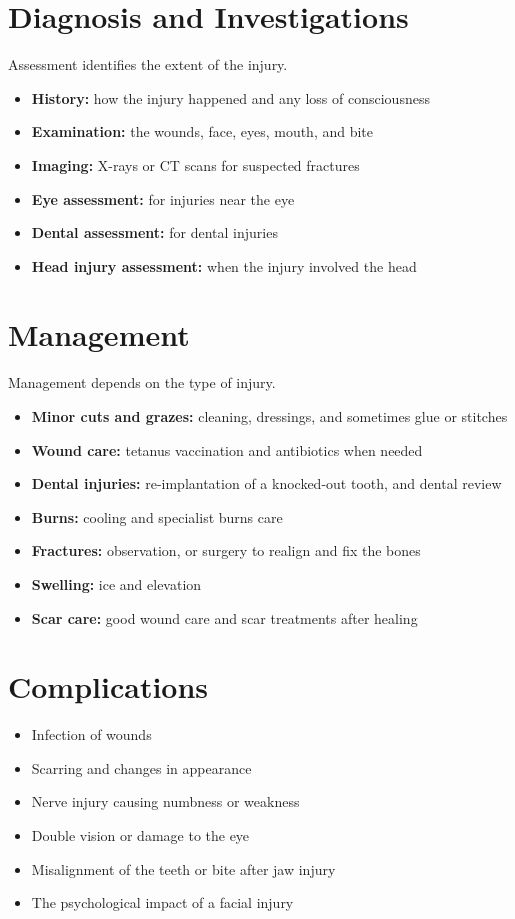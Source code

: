 \section*{Diagnosis and Investigations}
Assessment identifies the extent of the injury.
\begin{itemize}
    \item \textbf{History:} how the injury happened and any loss of consciousness
    \item \textbf{Examination:} the wounds, face, eyes, mouth, and bite
    \item \textbf{Imaging:} X-rays or CT scans for suspected fractures
    \item \textbf{Eye assessment:} for injuries near the eye
    \item \textbf{Dental assessment:} for dental injuries
    \item \textbf{Head injury assessment:} when the injury involved the head
\end{itemize}

\section*{Management}
Management depends on the type of injury.
\begin{itemize}
    \item \textbf{Minor cuts and grazes:} cleaning, dressings, and sometimes glue or stitches
    \item \textbf{Wound care:} tetanus vaccination and antibiotics when needed
    \item \textbf{Dental injuries:} re-implantation of a knocked-out tooth, and dental review
    \item \textbf{Burns:} cooling and specialist burns care
    \item \textbf{Fractures:} observation, or surgery to realign and fix the bones
    \item \textbf{Swelling:} ice and elevation
    \item \textbf{Scar care:} good wound care and scar treatments after healing
\end{itemize}

\section*{Complications}
\begin{itemize}
    \item Infection of wounds
    \item Scarring and changes in appearance
    \item Nerve injury causing numbness or weakness
    \item Double vision or damage to the eye
    \item Misalignment of the teeth or bite after jaw injury
    \item The psychological impact of a facial injury
\end{itemize}

